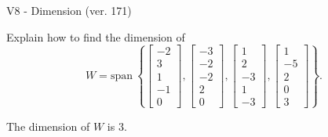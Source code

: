\begin{exercise}
  \begin{exerciseTitle}V8 - Dimension (ver. 171)\end{exerciseTitle}
  \begin{exerciseStatement}
    Explain how to find the dimension of 
\[W=\mathrm{span}\ \left\{\left[\begin{array}{r}
-2 \\
3 \\
1 \\
-1 \\
0
\end{array}\right] , \left[\begin{array}{r}
-3 \\
-2 \\
-2 \\
2 \\
0
\end{array}\right] , \left[\begin{array}{r}
1 \\
2 \\
-3 \\
1 \\
-3
\end{array}\right] , \left[\begin{array}{r}
1 \\
-5 \\
2 \\
0 \\
3
\end{array}\right]\right\}.\]



  \end{exerciseStatement}
  \begin{exerciseAnswer}
   The dimension of \(W\) is  \(3\).
  


  \end{exerciseAnswer}
\end{exercise}